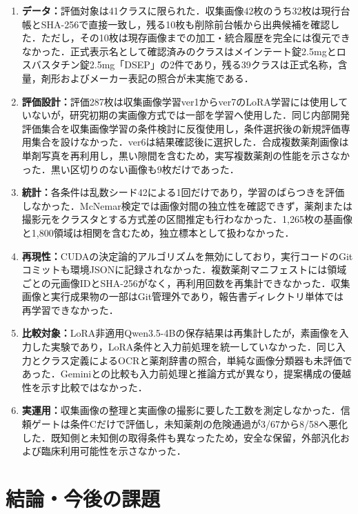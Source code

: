 \documentclass[uplatex,dvipdfmx]{jsarticle}
\begin{document}
{\small
\begin{enumerate}
\setlength{\itemsep}{0pt}
  \item \textbf{データ：}評価対象は41クラスに限られた．収集画像42枚のうち32枚は現行台帳とSHA-256で直接一致し，残る10枚も削除前台帳から出典候補を確認した．ただし，その10枚は現存画像までの加工・統合履歴を完全には復元できなかった．正式表示名として確認済みのクラスはメインテート錠2.5mgとロスバスタチン錠2.5mg「DSEP」の2件であり，残る39クラスは正式名称，含量，剤形およびメーカー表記の照合が未実施である．
  \item \textbf{評価設計：}評価287枚は収集画像学習ver1からver7のLoRA学習には使用していないが，研究初期の実画像方式では一部を学習へ使用した．同じ内部開発評価集合を収集画像学習の条件検討に反復使用し，条件選択後の新規評価専用集合を設けなかった．ver6は結果確認後に選択した．合成複数薬剤画像は単剤写真を再利用し，黒い隙間を含むため，実写複数薬剤の性能を示さなかった．黒い区切りのない画像も9枚だけであった．
  \item \textbf{統計：}各条件は乱数シード42による1回だけであり，学習のばらつきを評価しなかった．McNemar検定では画像対間の独立性を確認できず，薬剤または撮影元をクラスタとする方式差の区間推定も行わなかった．1,265枚の基画像と1,800領域は相関を含むため，独立標本として扱わなかった．
  \item \textbf{再現性：}CUDAの決定論的アルゴリズムを無効にしており，実行コードのGitコミットも環境JSONに記録されなかった．複数薬剤マニフェストには領域ごとの元画像IDとSHA-256がなく，再利用回数を再集計できなかった．収集画像と実行成果物の一部はGit管理外であり，報告書ディレクトリ単体では再学習できなかった．
  \item \textbf{比較対象：}LoRA非適用Qwen3.5-4Bの保存結果は再集計したが，素画像を入力した実験であり，LoRA条件と入力前処理を統一していなかった．同じ入力とクラス定義によるOCRと薬剤辞書の照合，単純な画像分類器も未評価であった．Geminiとの比較も入力前処理と推論方式が異なり，提案構成の優越性を示す比較ではなかった．
  \item \textbf{実運用：}収集画像の整理と実画像の撮影に要した工数を測定しなかった．信頼ゲートは条件Cだけで評価し，未知薬剤の危険通過が3/67から8/58へ悪化した．既知側と未知側の取得条件も異なったため，安全な保留，外部汎化および臨床利用可能性を示さなかった．
\end{enumerate}
}

\clearpage
\section{結論・今後の課題}\label{sec:conclusion}
\end{document}

